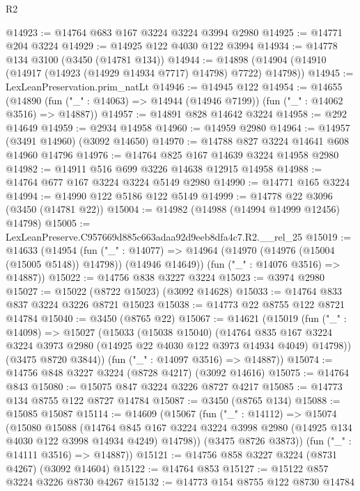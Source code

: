 \begin{lexlean}{R2}
\begin{coremodule}
@14923 := @14764 @683 @167 @3224 @3224 @3994 @2980
@14925 := @14771 @204 @3224
@14929 := @14925 @122 @4030 @122 @3994
@14934 := @14778 @134 @3100 (@3450 (@14781 @134))
@14944 := @14898 (@14904 (@14910 (@14917 (@14923 (@14929 @14934 @7717) @14798) @7722) @14798))
@14945 := LexLeanPreservation.prim_natLt
@14946 := @14945 @122
@14954 := @14655
    (@14890 (fun ("_" : @14063) => @14944 (@14946 @7199)) (fun ("_" : @14062 @3516) => @14887))
@14957 := @14891 @828 @14642 @3224
@14958 := @292 @14649
@14959 := @2934 @14958
@14960 := @14959 @2980
@14964 := @14957 (@3491 @14960) (@3092 @14650)
@14970 := @14788 @827 @3224 @14641 @608 @14960 @14796
@14976 := @14764 @825 @167 @14639 @3224 @14958 @2980
@14982 := @14911 @516 @699 @3226 @14638 @12915 @14958
@14988 := @14764 @677 @167 @3224 @3224 @5149 @2980
@14990 := @14771 @165 @3224
@14994 := @14990 @122 @5186 @122 @5149
@14999 := @14778 @22 @3096 (@3450 (@14781 @22))
@15004 := @14982 (@14988 (@14994 @14999 @12456) @14798)
@15005 := LexLeanPreserve.C957669d885c663adaa92d9eeb8dfa4c7.R2.__rel_25
@15019 := @14633
    (@14954
      (fun ("_" : @14077) =>
      @14964 (@14970 (@14976 (@15004 (@15005 @5148)) @14798)) (@14946 @14649))
      (fun ("_" : @14076 @3516) => @14887))
@15022 := @14756 @838 @3227 @3224
@15023 := @3974 @2980
@15027 := @15022 (@8722 @15023) (@3092 @14628)
@15033 := @14764 @833 @837 @3224 @3226 @8721 @15023
@15038 := @14773 @22 @8755 @122 @8721 @14784
@15040 := @3450 (@8765 @22)
@15067 := @14621
    (@15019
      (fun ("_" : @14098) =>
      @15027
        (@15033
          (@15038 @15040)
          (@14764
            @835
            @167
            @3224
            @3224
            @3973
            @2980
            (@14925 @22 @4030 @122 @3973 @14934 @4049)
            @14798))
        (@3475 @8720 @3844))
      (fun ("_" : @14097 @3516) => @14887))
@15074 := @14756 @848 @3227 @3224 (@8728 @4217) (@3092 @14616)
@15075 := @14764 @843
@15080 := @15075 @847 @3224 @3226 @8727 @4217
@15085 := @14773 @134 @8755 @122 @8727 @14784
@15087 := @3450 (@8765 @134)
@15088 := @15085 @15087
@15114 := @14609
    (@15067
      (fun ("_" : @14112) =>
      @15074
        (@15080
          @15088
          (@14764
            @845
            @167
            @3224
            @3224
            @3998
            @2980
            (@14925 @134 @4030 @122 @3998 @14934 @4249)
            @14798))
        (@3475 @8726 @3873))
      (fun ("_" : @14111 @3516) => @14887))
@15121 := @14756 @858 @3227 @3224 (@8731 @4267) (@3092 @14604)
@15122 := @14764 @853
@15127 := @15122 @857 @3224 @3226 @8730 @4267
@15132 := @14773 @154 @8755 @122 @8730 @14784

\end{coremodule}
\end{lexlean}
